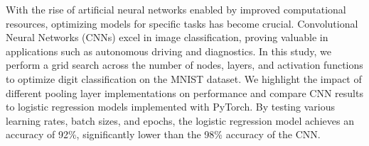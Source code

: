 With the rise of artificial neural networks enabled by improved computational resources, optimizing models for specific tasks has become crucial. Convolutional Neural Networks (CNNs) excel in image classification, proving valuable in applications such as autonomous driving and diagnostics. In this study, we perform a grid search across the number of nodes, layers, and activation functions to optimize digit classification on the MNIST dataset. We highlight the impact of different pooling layer implementations on performance and compare CNN results to logistic regression models implemented with PyTorch. By testing various learning rates, batch sizes, and epochs, the logistic regression model achieves an accuracy of 92\%, significantly lower than the 98\% accuracy of the CNN.